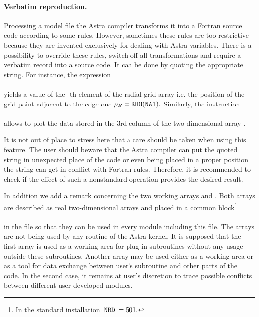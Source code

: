 \paragraph{Verbatim reproduction.}

Processing a model file the Astra compiler transforms it into a Fortran
source code according to some rules. 
However, sometimes these rules are too restrictive because they are
invented exclusively for dealing with Astra variables.
There is a possibility to override these rules, switch off all
transformations and require a verbatim record into a source code. 
It can be done by quoting the appropriate string. 
For instance, the expression 
\\
\\
yields a value of the -th element of the radial grid array
 i.e. the position of the grid point adjacent to the edge
one $\rho_B=\tt RHO(NA1).$
Similarly, the instruction 
\\
\hspace*{4cm}\\
allows to plot the data stored in the 3rd column of the two-dimensional
array .

It is not out of place to stress here that a care should be taken when
using this feature.
The user should beware that the Astra compiler can put the quoted
string in unexpected place of the code or even being placed in a
proper position the string can get in conflict with Fortran rules.
Therefore, it is recommended to check if the effect of such a
nonstandard operation provides the desired result.

In addition we add a remark concerning the two working arrays
 and . 
Both arrays are described as real two-dimensional arrays
and placed in a common block\footnote
{In the standard installation $\hspace*{2pt}{\tt NRD}\hspace*{2pt}=501.$} 
\\
\hspace*{1.5cm}
\\
in the file  
so that they can be used in every module including this file.
The arrays are not being used by any routine of the Astra kernel.
It is supposed that the first array  is used as a working
area for plug-in subroutines without any usage outside these subroutines.
Another array  may be used either as a working area or as a
tool for data exchange between user's subroutine and other parts of
the code. 
In the second case, it remains at user's discretion to trace possible 
conflicts between different user developed modules.

